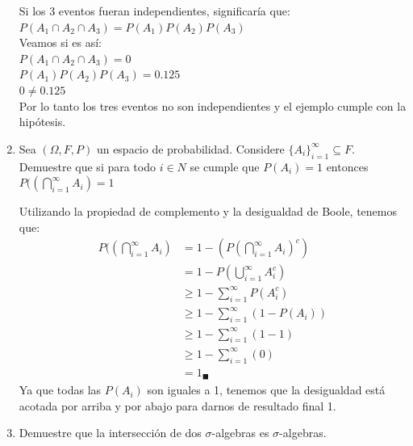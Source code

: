 \documentclass[12pt,a4paper]{report}
\begin{document}
\begin{enumerate}
{  Si los 3 eventos fueran independientes, significaría que: \\$P(A_{1} \cap A_{2} \cap A_{3}) = P(A_{1})P(A_{2})P(A_{3})$\\
  Veamos si es así:\\
  $P(A_{1} \cap A_{2} \cap A_{3}) = 0$\\
  $P(A_{1})P(A_{2})P(A_{3}) = 0.125$\\
  $ 0  \neq 0.125$ \\
  Por lo tanto los tres eventos no son independientes y el ejemplo cumple con la hipótesis.\\
  }


  \item{
 Sea $(\Omega, F, P)$ un espacio de probabilidad. Considere $\lbrace A_{i} \rbrace_{i=1}^{\infty} \subseteq F$. Demuestre que si para todo $i \in N$ se cumple que $P(A_{i})=1$ entonces $P((\bigcap\limits_{i=1}^{\infty}A_{i})=1$

Utilizando la propiedad de complemento y la desigualdad de Boole, tenemos que:
\begin{align*}
P((\bigcap\limits_{i=1}^{\infty}A_{i}) &= 1 - (P(\bigcap\limits_{i=1}^{\infty}A_{i})^c) \\
&= 1- P(\bigcup\limits_{i=1}^{\infty}A^c_{i}) \\
&\geqslant 1- \sum_{i=1}^{\infty} P(A^c_{i}) \\
&\geqslant 1- \sum_{i=1}^{\infty} (1- P(A_{i})) \\
&\geqslant 1- \sum_{i=1}^{\infty} (1- 1) \\
&\geqslant 1- \sum_{i=1}^{\infty} (0) \\
&= 1 _{\blacksquare}
\end{align*}
Ya que todas las $P(A_{i})$ son iguales a 1, tenemos que la desigualdad está acotada por arriba y por abajo para darnos de resultado final 1.



  }

  \item{
 Demuestre que la intersección de dos $\sigma$-algebras es $\sigma$-algebras.\\

}
\end{enumerate}
\end{document}

